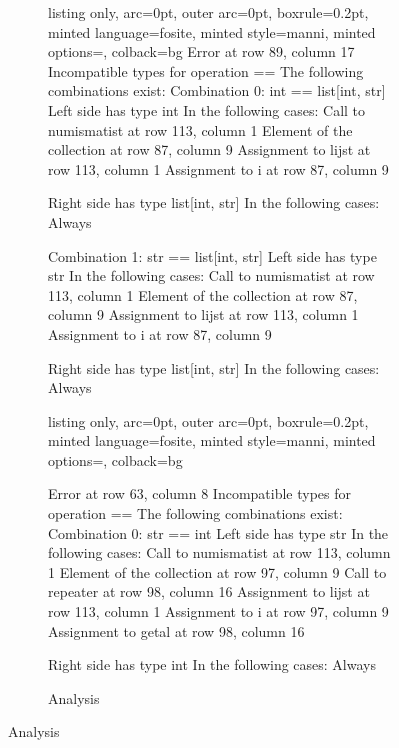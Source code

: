 \begin{figure}[h]
\ContinuedFloat %

\begin{subfigure}{\textwidth}
        \caption{Analysis}
        \label{sbm:sub7_anal}

\begin{tcblisting}{listing only, 
    arc=0pt,
    outer arc=0pt, 
    boxrule=0.2pt,
    minted language=fosite,
    minted style=manni,
    minted options={},
    colback=bg }
Error at row 89, column 17
  Incompatible types for operation ==
  The following combinations exist:
  Combination 0: int == list[int, str]
    Left side has type int
    In the following cases:
      Call to numismatist at row 113, column 1
      Element of the collection at row 87, column 9
      Assignment to lijst at row 113, column 1
      Assignment to i at row 87, column 9

    Right side has type list[int, str]
    In the following cases:
      Always


  Combination 1: str == list[int, str]
    Left side has type str
    In the following cases:
      Call to numismatist at row 113, column 1
      Element of the collection at row 87, column 9
      Assignment to lijst at row 113, column 1
      Assignment to i at row 87, column 9

    Right side has type list[int, str]
    In the following cases:
      Always
\end{tcblisting}

\begin{tcblisting}{listing only, 
    arc=0pt,
    outer arc=0pt, 
    boxrule=0.2pt,
    minted language=fosite,
    minted style=manni,
    minted options={},
    colback=bg }

Error at row 63, column 8
  Incompatible types for operation ==
  The following combinations exist:
  Combination 0: str == int
    Left side has type str
    In the following cases:
      Call to numismatist at row 113, column 1
      Element of the collection at row 97, column 9
      Call to repeater at row 98, column 16
      Assignment to lijst at row 113, column 1
      Assignment to i at row 97, column 9
      Assignment to getal at row 98, column 16

    Right side has type int
    In the following cases:
      Always

\end{tcblisting}
\end{subfigure}
\end{figure}
